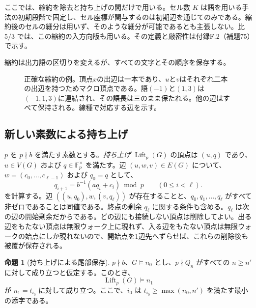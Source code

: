 \documentclass[11pt,reqno]{amsart}
\theoremstyle{definition}
\newtheorem{proposition}[theorem]{命題}
\theoremstyle{definition}
\theoremstyle{remark}
\begin{document}
ここでは、縮約を除去と持ち上げの間だけで用いる。セル数 \(K\) は語を用いる手法の初期段階で固定し、セル座標が関与するのは初期辺を通じてのみである。縮約後のセルの細分は用いず、そのような細分が可能であるとも主張しない。比 \(5/3\) では、この縮約の入方向版も用いる。その定義と厳密性は付録F.2（補題75）で示す。

縮約は出力語の区切りを変えるが、すべての文字とその順序を保存する。

\begin{figure}[htbp]
\centering

\caption{正確な縮約の例。頂点\(x\)の出辺は一本であり、\(u\)と\(v\)はそれぞれ二本の出辺を持つためマクロ頂点である。語\((-1)\)と\((1,3)\)は\((-1,1,3)\)に連結され、その語長は三のまま保たれる。他の辺はすべて保持される。線種で対応する辺を示す。}
\label{fig:word-contraction}
\end{figure}

\subsection{新しい素数による持ち上げ}\label{sec:4.4}

\(p\) を \(p\nmid b\) を満たす素数とする。\emph{持ち上げ} \(\operatorname{Lift}_p(G)\) の頂点は \((u,q)\) であり、\(u\in V(G)\) および \(q\in\mathbb F_p^\times\) を満たす。辺 \((u,w,v)\in E(G)\) について、\(w=(c_0,\ldots,c_{\ell-1})\) および \(q_0=q\) として、
\[
q_{i+1}=b^{-1}(aq_i+c_i)\bmod p\qquad(0\le i<\ell).
\]
を計算する。辺 \(((u,q_0),w,(v,q_\ell))\) が存在することと、\(q_0,q_1,\ldots,q_\ell\) がすべて非ゼロであることは同値である。終点の剰余 \(q_\ell\) に関する条件も含める。\(q_\ell\) は次の辺の開始剰余だからである。どの辺にも接続しない頂点は削除してよい。出る辺をもたない頂点は無限ウォーク上に現れず、入る辺をもたない頂点は無限ウォークの始点にしか現れないので、開始点を1辺先へずらせば、これらの削除後も被覆が保存される。

\begin{samepage}
\begin{proposition}[持ち上げによる尾部保存]\leavevmode\label{thm:17}
\(p\nmid b\)、\(G\models n_0\) とし、\(p\nmid Q_n\) がすべての \(n\ge n'\) に対して成り立つと仮定する。このとき、
\[
\operatorname{Lift}_p(G)\models n_1
\]
が \(n_1=t_{i_0}\) に対して成り立つ。ここで、\(i_0\) は \(t_{i_0}\ge\max(n_0,n')\) を満たす最小の添字である。
\label{thm-end:17}
\end{proposition}
\end{samepage}
\end{document}
